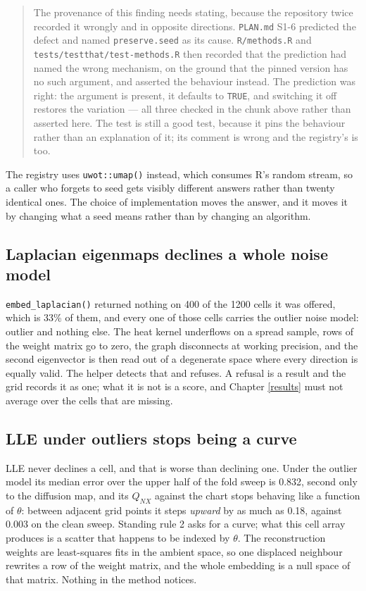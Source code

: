 \documentclass[
  british,
  a4paper,
]{book}
\newenvironment{boxreport}{\begin{quote}}{\end{quote}}
\begin{document}
\begin{boxreport}
The provenance of this finding needs stating, because the repository
twice recorded it wrongly and in opposite directions. \texttt{PLAN.md}
S1-6 predicted the defect and named \texttt{preserve.seed} as its cause.
\texttt{R/methods.R} and \texttt{tests/testthat/test-methods.R} then
recorded that the prediction had named the wrong mechanism, on the
ground that the pinned version has no such argument, and asserted the
behaviour instead. The prediction was right: the argument is present, it
defaults to \texttt{TRUE}, and switching it off restores the variation
--- all three checked in the chunk above rather than asserted here. The
test is still a good test, because it pins the behaviour rather than an
explanation of it; its comment is wrong and the registry's is too.
\end{boxreport}

The registry uses \texttt{uwot::umap()} instead, which consumes R's random stream, so
a caller who forgets to seed gets visibly different answers rather than twenty
identical ones. The choice of implementation moves the answer, and it moves it
by changing what a seed means rather than by changing an algorithm.

\subsection{Laplacian eigenmaps declines a whole noise model}\label{laplacian-eigenmaps-declines-a-whole-noise-model}

\texttt{embed\_laplacian()} returned nothing on 400 of the
1200 cells it was offered, which is
33\% of them, and every one of those cells carries the
outlier noise model: outlier and nothing else.
The heat kernel underflows on a spread sample, rows of the weight matrix go to
zero, the graph disconnects at working precision, and the second eigenvector is
then read out of a degenerate space where every direction is equally valid. The
helper detects that and refuses. A refusal is a result and the grid records it
as one; what it is not is a score, and Chapter \ref{results} must not average
over the cells that are missing.

\subsection{LLE under outliers stops being a curve}\label{lle-under-outliers-stops-being-a-curve}

LLE never declines a cell, and that is worse than declining one. Under the
outlier model its median error over the upper half of the fold sweep is
0.832, second only to the diffusion map,
and its \(Q_{NX}\) against the chart stops behaving like a function of \(\theta\):
between adjacent grid points it steps \emph{upward} by as much as
0.18, against
0.003 on the clean sweep. Standing rule 2 asks for
a curve; what this cell array produces is a scatter that happens to be indexed
by \(\theta\). The reconstruction weights are least-squares fits in the ambient
space, so one displaced neighbour rewrites a row of the weight matrix, and the
whole embedding is a null space of that matrix. Nothing in the method notices.
\end{document}
